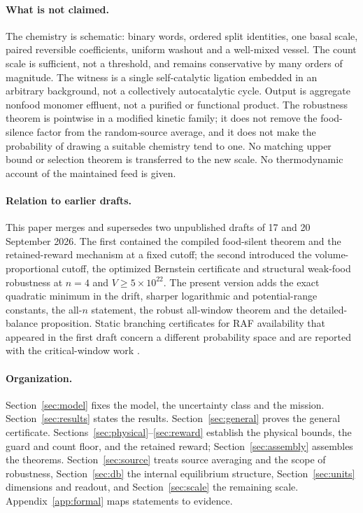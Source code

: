 \documentclass[11pt,letterpaper]{article}
\theoremstyle{plain}
\theoremstyle{definition}
\theoremstyle{remark}
\numberwithin{equation}{section}
\begin{document}
\paragraph{What is not claimed.}
The chemistry is schematic: binary words, ordered split identities, one basal scale, paired reversible coefficients, uniform washout and a well-mixed vessel. The count scale is sufficient, not a threshold, and remains conservative by many orders of magnitude. The witness is a single self-catalytic ligation embedded in an arbitrary background, not a collectively autocatalytic cycle. Output is aggregate nonfood monomer effluent, not a purified or functional product. The robustness theorem is pointwise in a modified kinetic family; it does not remove the food-silence factor from the random-source average, and it does not make the probability of drawing a suitable chemistry tend to one. No matching upper bound or selection theorem is transferred to the new scale. No thermodynamic account of the maintained feed is given.

\paragraph{Relation to earlier drafts.}
This paper merges and supersedes two unpublished drafts of 17 and 20 September 2026. The first contained the compiled food-silent theorem and the retained-reward mechanism at a fixed cutoff; the second introduced the volume-proportional cutoff, the optimized Bernstein certificate and structural weak-food robustness at $n=4$ and $V\ge5\times10^{22}$. The present version adds the exact quadratic minimum in the drift, sharper logarithmic and potential-range constants, the all-$n$ statement, the robust all-window theorem and the detailed-balance proposition. Static branching certificates for RAF availability that appeared in the first draft concern a different probability space and are reported with the critical-window work \cite{splitwindow2026,quotientwindow2026}.

\paragraph{Organization.}
Section~\ref{sec:model} fixes the model, the uncertainty class and the mission. Section~\ref{sec:results} states the results. Section~\ref{sec:general} proves the general certificate. Sections~\ref{sec:physical}--\ref{sec:reward} establish the physical bounds, the guard and count floor, and the retained reward; Section~\ref{sec:assembly} assembles the theorems. Section~\ref{sec:source} treats source averaging and the scope of robustness, Section~\ref{sec:db} the internal equilibrium structure, Section~\ref{sec:units} dimensions and readout, and Section~\ref{sec:scale} the remaining scale. Appendix~\ref{app:formal} maps statements to evidence.
\end{document}

